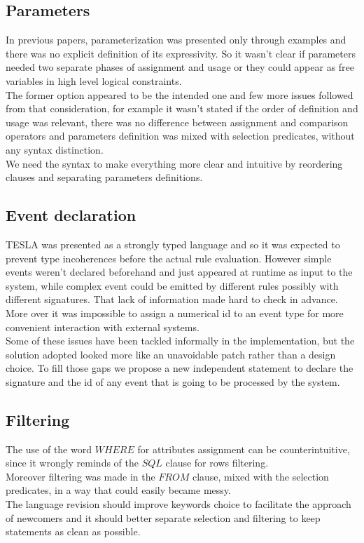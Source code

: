 \subsection{Parameters}
In previous papers, parameterization was presented only through examples and there was no explicit definition of its expressivity. So it wasn't clear if parameters needed two separate phases of assignment and usage or they could appear as free variables in high level logical constraints.\\
The former option appeared to be the intended one and few more issues followed from that consideration, for example it wasn't stated if the order of definition and usage was relevant, there was no difference between assignment and comparison operators and parameters definition was mixed with selection predicates, without any syntax distinction.\\
We need the syntax to make everything more clear and intuitive by reordering clauses and separating parameters definitions.

\subsection{Event declaration}
TESLA was presented as a strongly typed language and so it was expected to prevent type incoherences before the actual rule evaluation. However simple events weren't declared beforehand and just appeared at runtime as input to the system, while complex event could be emitted by different rules possibly with different signatures. That lack of information made hard to check in advance.\\
More over it was impossible to assign a numerical id to an event type for more convenient interaction with external systems.\\
Some of these issues have been tackled informally in the implementation, but the solution adopted looked more like an unavoidable patch rather than a design choice. To fill those gaps we propose a new independent statement to declare the signature and the id of any event that is going to be processed by the system.

\subsection{Filtering}
The use of the word $WHERE$ for attributes assignment can be counterintuitive, since it wrongly reminds of the $SQL$  clause for rows filtering.\\
Moreover filtering was made in the $FROM$ clause, mixed with the selection predicates, in a way that could easily became messy.\\
The language revision should improve keywords choice to facilitate the approach of newcomers and it should better separate selection and filtering to keep statements as clean as possible.

